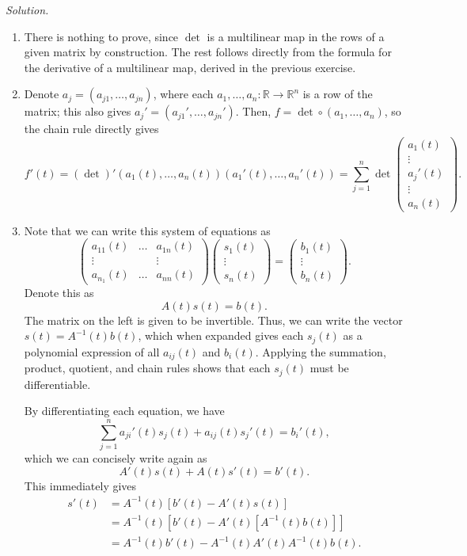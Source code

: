 \documentclass[11pt]{report}
\newcommand{\R}{\mathbb{R}}
\newcommand{\solution}{\noindent\textit{Solution.} }
\begin{document}
    \solution \begin{enumerate}
        \item There is nothing to prove, since $\det$ is a multilinear map in the
        rows of a given matrix by construction. The rest follows directly from the
        formula for the derivative of a multilinear map, derived in the previous
        exercise. 

        \item Denote $a_j = (a_{j1}, \dots, a_{jn})$, where each $a_1, \dots, a_n
        \colon \R \to \R^n$ is a row of the matrix; this also gives $a_j' =
        (a_{j1}', \dots, a_{jn}')$. Then, $f = \det\circ (a_1, \dots, a_n)$, so the
        chain rule directly gives \[
            f'(t) = (\det)'(a_1(t), \dots, a_n(t))(a_1'(t), \dots, a_n'(t)) 
            = \sum_{j = 1}^n \det \begin{pmatrix}
                a_1(t) \\ \vdots \\ a_j'(t) \\ \vdots \\ a_n(t) 
            \end{pmatrix}.
        \] 

        \item Note that we can write this system of equations as \[
            \begin{pmatrix}
                a_{11}(t) &\dots &a_{1n}(t) \\
                \vdots & & \vdots \\
                a_{n_1}(t) & \dots & a_{nn}(t)
            \end{pmatrix} \begin{pmatrix}
                s_1(t) \\ \vdots \\ s_n(t)
            \end{pmatrix} = \begin{pmatrix}
                b_1(t) \\ \vdots \\ b_n(t)
            \end{pmatrix}.
        \] Denote this as \[
            A(t)s(t) = b(t).
        \] The matrix on the left is given to be
        invertible. Thus, we can write the vector $s(t) = A^{-1}(t)b(t)$, which when
        expanded gives each $s_j(t)$ as a polynomial expression of all $a_{ij}(t)$
        and $b_i(t)$. Applying the summation, product, quotient, and chain rules
        shows that each $s_j(t)$ must be differentiable.

        By differentiating each equation, we have \[
            \sum_{j = 1}^n a_{ji}'(t)s_j(t) + a_{ij}(t)s_j'(t) = b_i'(t),
        \] which we can concisely write again as \[
            A'(t) s(t) + A(t) s'(t) = b'(t).
        \] This immediately gives \begin{align*}
            s'(t) &= A^{-1}(t)[b'(t) - A'(t)s(t)] \\
            &= A^{-1}(t)[b'(t) - A'(t)[A^{-1}(t)b(t)]] \\
            &= A^{-1}(t)b'(t) - A^{-1}(t)A'(t)A^{-1}(t)b(t).
        \end{align*}
    \end{enumerate}
\end{document}
